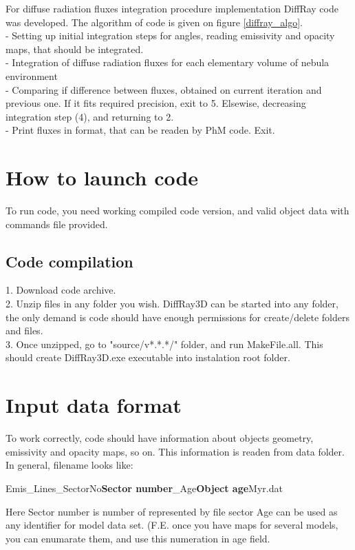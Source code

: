 \documentclass[a4paper]{article}
\begin{document}
For diffuse radiation fluxes integration procedure implementation DiffRay code was developed. The algorithm of code is given on figure \ref{diffray_algo}.\\
 - Setting up initial integration steps for angles, reading emissivity and opacity maps, that should be integrated.\\
 - Integration of diffuse radiation fluxes for each elementary volume of nebula environment\\
 - Comparing if difference between fluxes, obtained on current iteration and previous one. If it fits required precision, exit to 5. Elsewise, decreasing integration step (4), and returning to 2.\\
 - Print fluxes in format, that can be readen by PhM code. Exit.\\

\section{How to launch code}

To run code, you need working compiled code version, and valid object data with 
commands file provided.

\subsection{Code compilation}
1. Download code archive.\\
2. Unzip files in any folder you wish. DiffRay3D can be started into any folder, 
the only demand is code should have enough permissions for create/delete folders 
and files.\\
3. Once unzipped, go to "source/v*.*.*/" folder, and run MakeFile.all. This should
create DiffRay3D.exe executable into instalation root folder.\\

\section{Input data format}
To work correctly, code should have information about objects geometry, emissivity and opacity maps,
so on. This information is readen from data folder. In general, filename looks like:

Emis\_Lines\_SectorNo{\bf Sector number}\_Age{\bf Object age}Myr.dat

Here Sector number is number of represented by file sector
Age can be used as any identifier for model data set. (F.E. once you have maps for several models,
you can enumarate them, and use this numeration in age field.
\end{document}
